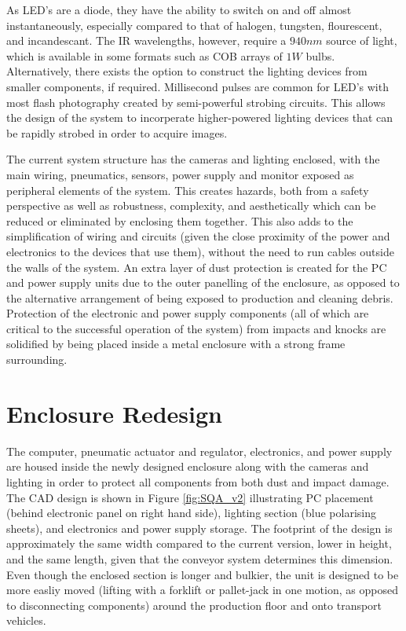 \documentclass[fleqn,twoside,12pt]{report}
\begin{document}
As LED's are a diode, they have the ability to switch on and off almost instantaneously, especially compared to that of halogen, tungsten, flourescent, and incandescant. The IR wavelengths, however, require a $940nm$ source of light, which is available in some formats such as COB arrays of $1W$ bulbs. Alternatively, there exists the option to construct the lighting devices from smaller components, if required. Millisecond pulses are common for LED's with most flash photography created by semi-powerful strobing circuits. This allows the design of the system to incorperate higher-powered lighting devices that can be rapidly strobed in order to acquire images.

The current system structure has the cameras and lighting enclosed, with the main wiring, pneumatics, sensors, power supply and monitor exposed as peripheral elements of the system. This creates hazards, both from a safety perspective as well as robustness, complexity, and aesthetically which can be reduced or eliminated by enclosing them together. This also adds to the simplification of wiring and circuits (given the close proximity of the power and electronics to the devices that use them), without the need to run cables outside the walls of the system. An extra layer of dust protection is created for the PC and power supply units due to the outer panelling of the enclosure, as opposed to the alternative arrangement of being exposed to production and cleaning debris. Protection of the electronic and power supply components (all of which are critical to the successful operation of the system) from impacts and knocks are solidified by being placed inside a metal enclosure with a strong frame surrounding.


\section{Enclosure Redesign}


The computer, pneumatic actuator and regulator, electronics, and power supply are housed inside the newly designed enclosure along with the cameras and lighting in order to protect all components from both dust and impact damage. The CAD design is shown in Figure \ref{fig:SQA_v2} illustrating PC placement (behind electronic panel on right hand side), lighting section (blue polarising sheets), and electronics and power supply storage. The footprint of the design is approximately the same width compared to the current version, lower in height, and the same length, given that the conveyor system determines this dimension. Even though the enclosed section is longer and bulkier, the unit is designed to be more easliy moved (lifting with a forklift or pallet-jack in one motion, as opposed to disconnecting components) around the production floor and onto transport vehicles. 
\end{document}
